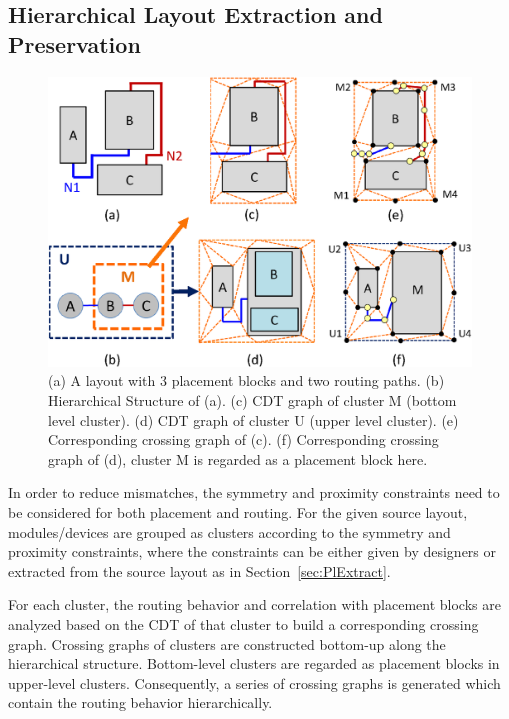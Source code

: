     \subsection{Hierarchical Layout Extraction and Preservation}\label{sec:HLE}

      \begin{figure}[t]
        \begin{center}
        \includegraphics[width=\textwidth]{Fig/Chapter4/HIER.eps}
        \caption{
           (a) A layout with 3 placement blocks and two routing paths. 
           (b) Hierarchical Structure of (a).
           (c) CDT graph of cluster M (bottom level cluster).
           (d) CDT graph of cluster U (upper level cluster).
           (e) Corresponding crossing graph of (c).
           (f) Corresponding crossing graph of (d), cluster M is regarded as a placement block here.
          }
        \label{fig:HIER}
        \end{center}
      \end{figure}

      In order to reduce mismatches, the symmetry and proximity constraints need to be considered for both placement and routing. 
      For the given source layout, modules/devices are grouped as clusters according to the symmetry and proximity constraints, 
      where the constraints can be either given by designers or extracted from the source layout as in Section~\ref{sec:PlExtract}.

      For each cluster, the routing behavior and correlation with placement blocks are analyzed based on the CDT of that cluster to build a corresponding crossing graph. 
      Crossing graphs of clusters are constructed bottom-up along the hierarchical structure. 
      Bottom-level clusters are regarded as placement blocks in upper-level clusters. 
      Consequently, a series of crossing graphs is generated which contain the routing behavior hierarchically.

